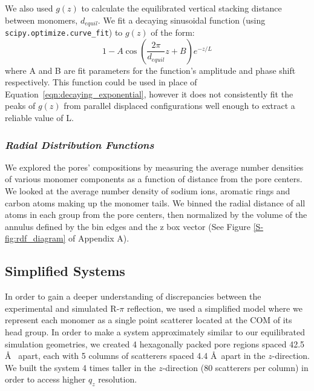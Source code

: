   We also used $g(z)$ to calculate the equilibrated vertical stacking distance between
  monomers, $d_{equil}$. We fit a decaying sinusoidal function (using \texttt{scipy.optimize.curve\_fit}) to 
  $g(z)$ of the form:
  \begin{equation}
  	1 - A\cos\left(\frac{2\pi}{\mathit{d}_{equil}}z + B\right)e^{-z/L}
  	\label{eqn:decaying_sinusoid}
  \end{equation}
  where A and B are fit parameters for the function's amplitude and phase shift respectively.
  This function could be used in place of Equation~\ref{eqn:decaying_exponential}, however
  it does not consistently fit the peaks of $g(z)$ from parallel displaced configurations 
  well enough to extract a reliable value of L.
  
  \subsubsection{\textit{Radial Distribution Functions}}\label{method:radial_distribution_functions}

  We explored the pores' compositions by measuring the average number densities
  of various monomer components as a function of distance from the pore centers.
  We looked at the average number density of sodium ions, aromatic rings and 
  carbon atoms making up the monomer tails. We binned the radial distance of all
  atoms in each group from the pore centers, then normalized by the volume of the
  annulus defined by the bin edges and the z box vector (See Figure \ref{S-fig:rdf_diagram}
  of Appendix A). 

  \subsection{Simplified Systems}\label{method:simple_systems}
  
  In order to gain a deeper understanding of discrepancies between the
  experimental and simulated R-$\pi$ reflection, we used a simplified model where
  we represent each monomer as a single point scatterer located at the COM of its
  head group. In order to make a system approximately similar to our equilibrated
  simulation geometries, we created 4 hexagonally packed pore regions spaced 42.5
  \AA~ apart, each with 5 columns of scatterers spaced 4.4 \AA~apart in the
  $z$-direction. We built the system 4 times taller in the $z$-direction (80
  scatterers per column) in order to access higher $q_z$ resolution.
  
